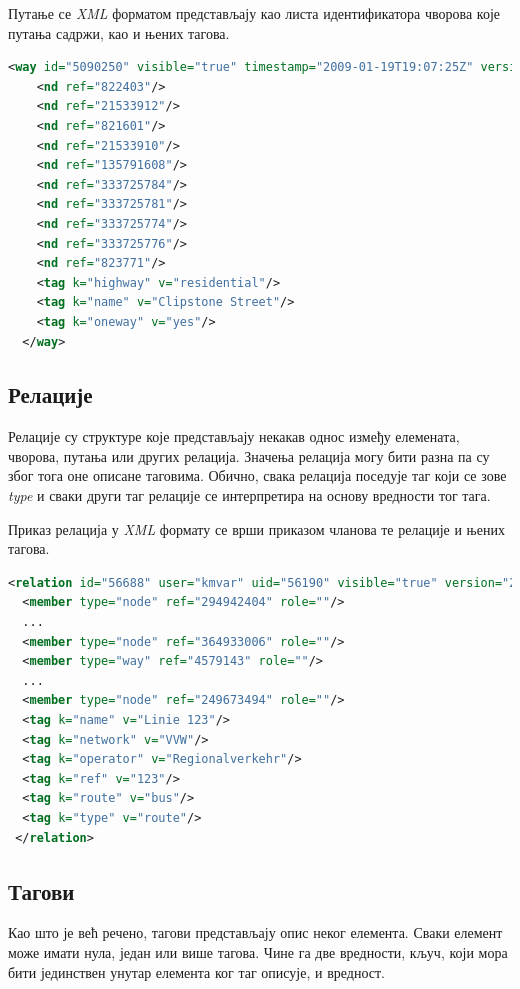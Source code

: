 \documentclass[12pt,oneside]{memoir}
\begin{document}
Путање се \textit{XML} форматом представљају као листа идентификатора чворова које путања садржи, као и њених тагова.

\begin{lstlisting}[language=XML]
<way id="5090250" visible="true" timestamp="2009-01-19T19:07:25Z" version="8" changeset="816806" user="Blumpsy" uid="64226">
    <nd ref="822403"/>
    <nd ref="21533912"/>
    <nd ref="821601"/>
    <nd ref="21533910"/>
    <nd ref="135791608"/>
    <nd ref="333725784"/>
    <nd ref="333725781"/>
    <nd ref="333725774"/>
    <nd ref="333725776"/>
    <nd ref="823771"/>
    <tag k="highway" v="residential"/>
    <tag k="name" v="Clipstone Street"/>
    <tag k="oneway" v="yes"/>
  </way>
\end{lstlisting}

\subsection{Релације}
\label{subsec:osm_relations}

Релације су структуре које представљају некакав однос између елемената, чворова, путања или других релација. Значења релација могу бити разна па су због тога оне описане таговима. Обично, свака релација поседује таг који се зове \textit{type} и сваки други таг релације се интерпретира на основу вредности тог тага. \cite{osm_wiki}

Приказ релација у \textit{XML} формату се врши приказом чланова те релације и њених тагова.

\begin{lstlisting}[language=XML]
 <relation id="56688" user="kmvar" uid="56190" visible="true" version="28" changeset="6947637" timestamp="2011-01-12T14:23:49Z">
  <member type="node" ref="294942404" role=""/>
  ...
  <member type="node" ref="364933006" role=""/>
  <member type="way" ref="4579143" role=""/>
  ...
  <member type="node" ref="249673494" role=""/>
  <tag k="name" v="Linie 123"/>
  <tag k="network" v="VVW"/>
  <tag k="operator" v="Regionalverkehr"/>
  <tag k="ref" v="123"/>
  <tag k="route" v="bus"/>
  <tag k="type" v="route"/>
 </relation>	
\end{lstlisting}

\subsection{Тагови}
\label{subsec:osm_tags}

Као што је већ речено, тагови представљају опис неког елемента. Сваки елемент може имати нула, један или више тагова. Чине га две вредности, кључ, који мора бити јединствен унутар елемента ког таг описује, и вредност. \cite{osm_wiki}
\end{document}
